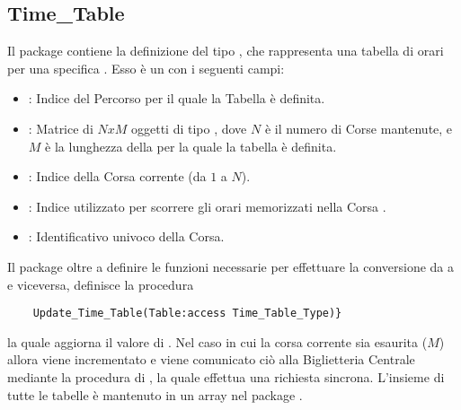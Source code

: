 	\subsection{Time\_Table}
	
	Il package  contiene la definizione del tipo , che rappresenta una tabella di orari per una specifica . Esso è un  con i seguenti campi:
	\begin{itemize}
		\item {}: Indice del Percorso per il quale la Tabella è definita.
		\item {}: Matrice di $NxM$ oggetti di tipo , dove $N$ è il numero di Corse mantenute, e $M$ è la lunghezza della  per la quale la tabella è definita.
		\item {}: Indice della Corsa corrente (da $1$ a $N$).
		\item {}: Indice utilizzato per scorrere gli orari memorizzati nella Corsa .
		\item {}: Identificativo univoco della Corsa. 
	\end{itemize}
	
	Il package oltre a definire le funzioni necessarie per effettuare la conversione da  a  e viceversa, definisce la procedura 
\begin{lstlisting}
	Update_Time_Table(Table:access Time_Table_Type)} 
\end{lstlisting}
 la quale aggiorna il valore di . Nel caso in cui la corsa corrente  sia esaurita ($M$) allora  viene incrementato e viene comunicato ciò alla Biglietteria Centrale mediante la procedura  di , la quale effettua una richiesta sincrona.
	L'insieme di tutte le tabelle è mantenuto in un array nel package .
